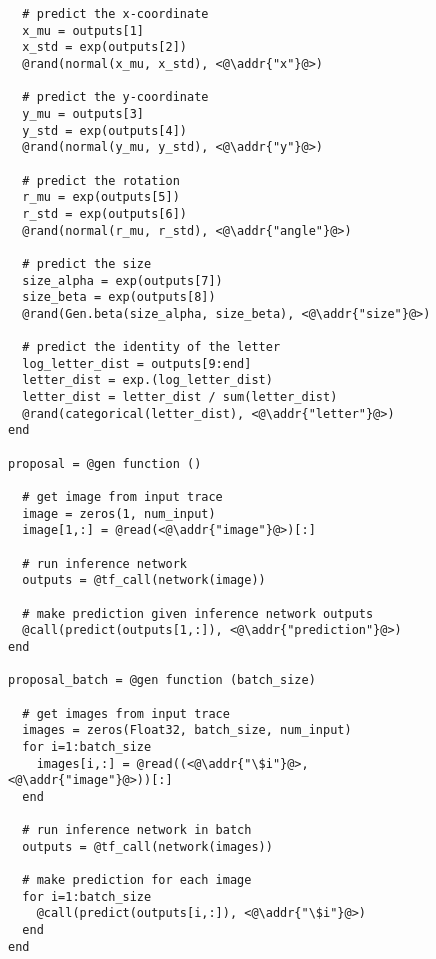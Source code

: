 \begin{figure}[t]
\begin{minipage}[t]{0.4\textwidth}
\begin{lstlisting}
  # predict the x-coordinate
  x_mu = outputs[1]
  x_std = exp(outputs[2])
  @rand(normal(x_mu, x_std), <@\addr{"x"}@>)

  # predict the y-coordinate
  y_mu = outputs[3]
  y_std = exp(outputs[4])
  @rand(normal(y_mu, y_std), <@\addr{"y"}@>)

  # predict the rotation
  r_mu = exp(outputs[5])
  r_std = exp(outputs[6])
  @rand(normal(r_mu, r_std), <@\addr{"angle"}@>)

  # predict the size 
  size_alpha = exp(outputs[7])
  size_beta = exp(outputs[8])
  @rand(Gen.beta(size_alpha, size_beta), <@\addr{"size"}@>)
  
  # predict the identity of the letter
  log_letter_dist = outputs[9:end]
  letter_dist = exp.(log_letter_dist)
  letter_dist = letter_dist / sum(letter_dist)
  @rand(categorical(letter_dist), <@\addr{"letter"}@>)
end

proposal = @gen function ()

  # get image from input trace
  image = zeros(1, num_input)
  image[1,:] = @read(<@\addr{"image"}@>)[:]

  # run inference network
  outputs = @tf_call(network(image))

  # make prediction given inference network outputs
  @call(predict(outputs[1,:]), <@\addr{"prediction"}@>)
end

proposal_batch = @gen function (batch_size)

  # get images from input trace
  images = zeros(Float32, batch_size, num_input)
  for i=1:batch_size
    images[i,:] = @read((<@\addr{"\$i"}@>, <@\addr{"image"}@>))[:]
  end

  # run inference network in batch
  outputs = @tf_call(network(images))
  
  # make prediction for each image
  for i=1:batch_size
    @call(predict(outputs[i,:]), <@\addr{"\$i"}@>)
  end
end
\end{lstlisting}
\end{minipage}
\caption{}
\label{fig:proposal-code-figure}
\end{figure}


